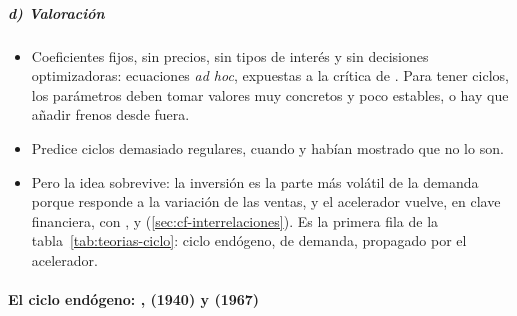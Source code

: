 \documentclass[11pt]{article}
\begin{document}
\subparagraph{d) Valoración}

\begin{itemize}
\item Coeficientes fijos, sin precios, sin tipos de interés y sin decisiones optimizadoras: ecuaciones \emph{ad hoc}, expuestas a la crítica de  . Para tener ciclos, los parámetros deben tomar valores muy concretos y poco estables, o hay que añadir frenos desde fuera.
\item Predice ciclos demasiado regulares, cuando  y  habían mostrado que no lo son.
\item Pero la idea sobrevive: la inversión es la parte más volátil de la demanda porque responde a la variación de las ventas, y el acelerador vuelve, en clave financiera, con ,  y  (\ref{sec:cf-interrelaciones}). Es la primera fila de la tabla~\ref{tab:teorias-ciclo}: ciclo endógeno, de demanda, propagado por el acelerador.
\end{itemize}

\paragraph{El ciclo endógeno: ,  (1940) y  (1967)}
\end{document}

